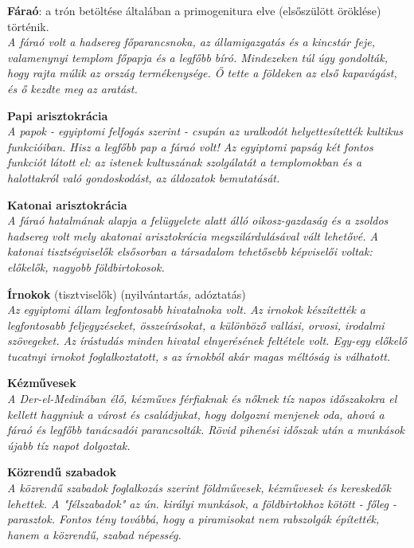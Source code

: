 \begin{compactitem}
	
	\item\textbf{ Fáraó}: a trón betöltése általában a primogenitura elve (elsőszülött öröklése) történik.\\
	\textit{A fáraó volt a hadsereg főparancsnoka, az államigazgatás és a kincstár feje, valamenynyi templom főpapja és a legfőbb bíró. Mindezeken túl úgy gondolták, hogy rajta múlik az ország termékenysége. Ő tette a földeken az első kapavágást, és ő kezdte meg az aratást.}
	
	\item\textbf{ Papi arisztokrácia}\\
	\textit{A papok - egyiptomi felfogás szerint - csupán az uralkodót helyettesítették kultikus funkcióiban. Hisz a legfőbb pap a fáraó volt! Az egyiptomi papság két fontos funkciót látott el: az istenek kultuszának szolgálatát a templomokban és a halottakról való gondoskodást, az áldozatok bemutatását.}
	
	\item \textbf{Katonai arisztokrácia}\\
	\textit{A fáraó hatalmának alapja a felügyelete alatt álló oikosz-gazdaság és a zsoldos hadsereg volt mely akatonai arisztokrácia megszilárdulásával vált lehetővé. A katonai tisztségviselők elsősorban a társadalom tehetősebb képviselői voltak: előkelők, nagyobb földbirtokosok.}
	
	\item \textbf{ Írnokok} (tisztviselők) (nyilvántartás, adóztatás)\\
	\textit{Az egyiptomi állam legfontosabb hivatalnoka volt. Az irnokok készítették a legfontosabb feljegyzéseket, összeírásokat, a különböző vallási, orvosi, irodalmi szövegeket. Az írástudás minden hivatal elnyerésének feltétele volt. Egy-egy előkelő tucatnyi irnokot foglalkoztatott, s az írnokból akár magas méltóság is válhatott.}
	
	\item \textbf{Kézművesek}\\
	\textit{A Der-el-Medinában élő, kézműves férfiaknak és nőknek tíz napos időszakokra el kellett hagyniuk a várost és családjukat, hogy dolgozni menjenek oda, ahová a fáraó és legfőbb tanácsadói parancsolták. Rövid pihenési időszak után a munkások újabb tíz napot dolgoztak.}
	
	\item\textbf{ Közrendű szabadok}\\
	\textit{A közrendű szabadok foglalkozás szerint földművesek, kézművesek és kereskedők lehettek. A "félszabadok" az ún. királyi munkások, a földbirtokhoz kötött - főleg - parasztok.
	Fontos tény továbbá, hogy a piramisokat nem rabszolgák építették, hanem a közrendű, szabad népesség.}


\end{compactitem}
